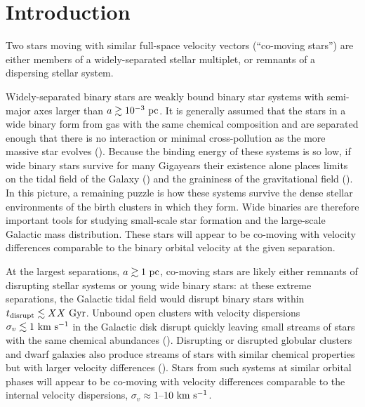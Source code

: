 \documentclass[manuscript, letterpaper]{aastex6}
\newcommand{\kms}{\ensuremath{\rm km~s^{-1}}}
\begin{document}

\section{Introduction} \label{sec:intro}

Two stars moving with similar full-space velocity vectors (``co-moving stars'')
are either members of a widely-separated stellar multiplet, or remnants of a
dispersing stellar system.

Widely-separated binary stars are weakly bound binary star systems with
semi-major axes larger than $a \gtrsim 10^{-3}~{\rm pc}$. It is generally
assumed that the stars in a wide binary form from gas with the same chemical
composition and are separated enough that there is no interaction or minimal
cross-pollution as the more massive star evolves (\citealt{todo}). Because the
binding energy of these systems is so low, if wide binary stars survive for many
Gigayears their existence alone places limits on the tidal field of the Galaxy
(\citealt{todo}) and the graininess of the gravitational field (\citealt{todo}).
In this picture, a remaining puzzle is how these systems survive the dense
stellar environments of the birth clusters in which they form. Wide binaries are
therefore important tools for studying small-scale star formation and the
large-scale Galactic mass distribution. These stars will appear to be co-moving
with velocity differences comparable to the binary orbital velocity at the
given separation.

At the largest separations, $a \gtrsim 1~{\rm pc}$, co-moving stars are likely
either remnants of disrupting stellar systems or young wide binary stars: at
these extreme separations, the Galactic tidal field would disrupt binary stars
within $t_{\rm disrupt} \lesssim XX~{\rm Gyr}$. Unbound open clusters with
velocity dispersions $\sigma_v \lesssim 1~\kms$ in the Galactic disk disrupt
quickly leaving small streams of stars with the same chemical abundances
(\citealt{chemicaltaggingstuff}). Disrupting or disrupted globular clusters and
dwarf galaxies also produce streams of stars with similar chemical properties
but with larger velocity differences (\citealt{streampeeps}). Stars from such
systems at similar orbital phases will appear to be co-moving with velocity
differences comparable to the internal velocity dispersions, $\sigma_v \approx
1$--$10~\kms$.
\end{document}
